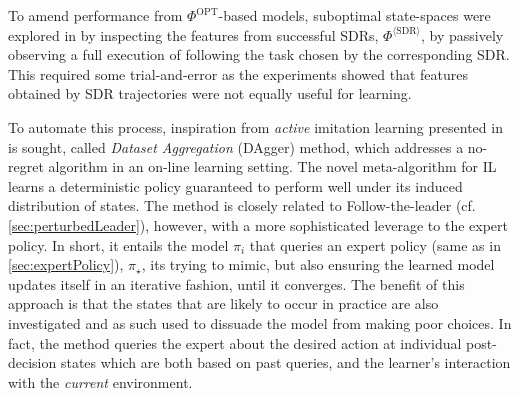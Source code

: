 \documentclass[smallextended]{svjour3}
\begin{document}
To amend performance from $\Phi^{\text{OPT}}$-based models, suboptimal 
state-spaces were explored in \cite{InRu15a} by inspecting the features from 
successful SDRs, $\Phi^{\langle\text{SDR}\rangle}$, by passively observing a 
full execution of following the task chosen by the corresponding SDR. 
This required some trial-and-error as the experiments showed that features 
obtained by SDR trajectories were not equally useful for learning.



To automate this process, inspiration from \emph{active} imitation learning 
presented in \cite{RossGB11} is sought, called \emph{Dataset Aggregation} 
(DAgger) method, which addresses a no-regret algorithm in an on-line learning 
setting. 
The novel meta-algorithm for IL learns a deterministic policy guaranteed to 
perform well under its induced distribution of states. 
The method is closely related to Follow-the-leader (cf. 
\cref{sec:perturbedLeader}), however, with a more sophisticated leverage to the 
expert policy. 
In short, it entails the model $\pi_i$ that queries an expert policy (same as 
in \cref{sec:expertPolicy}), $\pi_\star$, its trying to mimic, 
but also ensuring the learned model updates itself in an iterative fashion, 
until it converges. 
The benefit of this approach is that the states that are likely to occur in 
practice are also investigated and as such used to dissuade the model from 
making poor choices. In fact, the method queries the expert about the desired 
action at individual post-decision states which are both based on past queries, 
and the learner's interaction with the \emph{current} environment.
\end{document}
